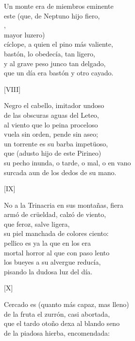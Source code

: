 \documentclass[11pt,a4paper,twoside]{article}
\begin{document}
Un monte era de miembros eminente\\
este (que, de Neptuno hijo fiero,\\
,\\
 mayor luzero)\\
cíclope, a quien el pino más valiente,\\
bastón, lo obedecía, tan ligero,\\
y al grave peso junco tan delgado,\\
que un día era bastón y otro cayado.\pend
\begin{center}
	[VIII]
\end{center}\pstart
Negro el cabello, imitador undoso\\
de las obscuras aguas del Leteo,\\
al viento que lo peina proceloso\\
vuela sin orden, pende sin aseo;\\
un torrente es su barba impetüoso,\\
que (adusto hijo de este Pirineo)\\
su pecho inunda, o tarde, o mal, o en vano\\
surcada aun de los dedos de su mano.\pend
\begin{center}
	[IX]
\end{center}\pstart
No a la Trinacria en sus montañas, fiera\\
armó de crüeldad, calzó de viento,\\
que  feroz, salve ligera,\\
su piel manchada de colores ciento:\\
pellico es ya la que en los  era\\
mortal horror al que con paso lento\\
los bueyes a su alvergue reducía,\\
pisando la dudosa luz del día.\pend
\begin{center}
	[X]
\end{center}\pstart
Cercado es (quanto más capaz, mas lleno)\\
de la fruta el zurrón, casi abortada,\\
que el tardo otoño dexa al blando seno\\
de la piadosa hierba, encomendada:\\
\end{document}
